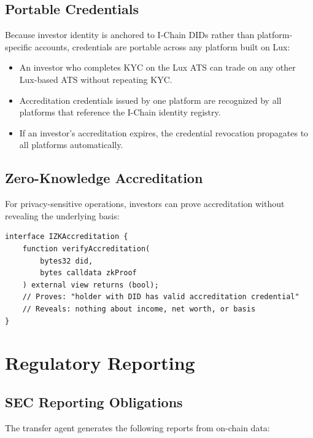 \documentclass[11pt,a4paper]{article}
\begin{document}
\subsection{Portable Credentials}

Because investor identity is anchored to I-Chain DIDs rather than platform-specific accounts, credentials are portable across any platform built on Lux:

\begin{itemize}[nosep]
  \item An investor who completes KYC on the Lux ATS \cite{lux-ats-architecture} can trade on any other Lux-based ATS without repeating KYC.
  \item Accreditation credentials issued by one platform are recognized by all platforms that reference the I-Chain identity registry.
  \item If an investor's accreditation expires, the credential revocation propagates to all platforms automatically.
\end{itemize}

\subsection{Zero-Knowledge Accreditation}

For privacy-sensitive operations, investors can prove accreditation without revealing the underlying basis:

\begin{lstlisting}[language=Solidity,caption={ZK accreditation verification.}]
interface IZKAccreditation {
    function verifyAccreditation(
        bytes32 did,
        bytes calldata zkProof
    ) external view returns (bool);
    // Proves: "holder with DID has valid accreditation credential"
    // Reveals: nothing about income, net worth, or basis
}
\end{lstlisting}

\section{Regulatory Reporting}\label{sec:reporting}

\subsection{SEC Reporting Obligations}

The transfer agent generates the following reports from on-chain data:
\end{document}
